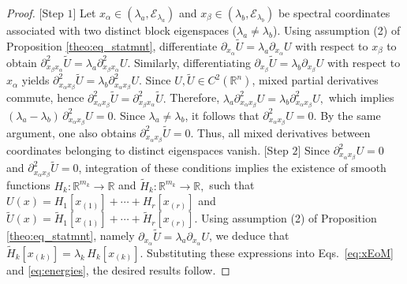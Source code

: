 \documentclass[10pt,a4paper]{amsart}
\begin{document}
\begin{proof}
%
$[$Step $1]$
Let $x_\alpha \in (\lambda_a, \mathcal{E}_{\lambda_a})$ and $x_\beta \in (\lambda_b, \mathcal{E}_{\lambda_b})$ be spectral coordinates associated with two distinct block eigenspaces ($\lambda_a \neq \lambda_b$). Using assumption (2) of Proposition \ref{theo:eq_statmnt}, differentiate $\partial_{x_\alpha} \widetilde U = \lambda_a \partial_{x_\alpha} U$ with respect to $x_\beta$ to obtain
$
\partial^2_{x_\beta x_\alpha} \widetilde U = \lambda_a \partial^2_{x_\beta x_\alpha} U.
$
Similarly, differentiating $\partial_{x_\beta} \widetilde U = \lambda_b \partial_{x_\beta} U$ with respect to $x_\alpha$ yields
$
\partial^2_{x_\alpha x_\beta} \widetilde U = \lambda_b \partial^2_{x_\alpha x_\beta} U.
$
Since $U, \widetilde U \in C^2(\mathbb{R}^n)$, mixed partial derivatives commute, hence
$
\partial^2_{x_\alpha x_\beta} \widetilde U = \partial^2_{x_\beta x_\alpha} \widetilde U.
$
Therefore,
$
\lambda_a \partial^2_{x_\alpha x_\beta} U = \lambda_b \partial^2_{x_\alpha x_\beta} U,
$
which implies
$
(\lambda_a - \lambda_b)\, \partial^2_{x_\alpha x_\beta} U = 0.
$
Since $\lambda_a \neq \lambda_b$, it follows that
$
\partial^2_{x_\alpha x_\beta} U = 0.
$
By the same argument, one also obtains $\partial^2_{x_\alpha x_\beta} \widetilde U = 0$. Thus, all mixed derivatives between coordinates belonging to distinct eigenspaces vanish.
$[$Step $2]$
Since $\partial^2_{x_\alpha x_\beta} U = 0$ and $\partial^2_{x_\alpha x_\beta} \widetilde U = 0$, integration of these conditions implies the existence of smooth functions
$
H_k : \mathbb{R}^{m_k} \to \mathbb{R}$ and 
$\widetilde H_k : \mathbb{R}^{m_k} \to \mathbb{R},
$
such that
$
U(x) = H_1[x_{(1)}] + \cdots + H_r[x_{(r)}]$ and 
$\widetilde U(x) = \widetilde H_1[x_{(1)}] + \cdots + \widetilde H_r[x_{(r)}].
$
Using assumption (2) of Proposition \ref{theo:eq_statmnt}, namely $\partial_{x_\alpha} \widetilde U = \lambda_a \partial_{x_\alpha} U$, we deduce that
$
\widetilde H_k[x_{(k)}] = \lambda_k\, H_k[x_{(k)}].
$
Substituting these expressions into Eqs.~\eqref{eq:xEoM} and \eqref{eq:energies}, the desired results follow.
\end{proof}
\end{document}

